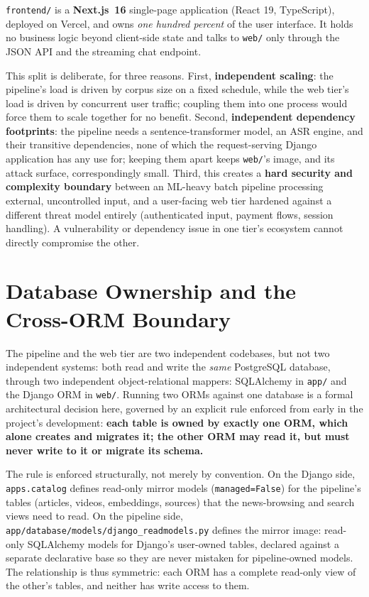 \texttt{frontend/} is a \textbf{Next.js~16} single-page application (React
19, TypeScript), deployed on Vercel, and owns \emph{one hundred percent} of
the user interface. It holds no business logic beyond client-side state and
talks to \texttt{web/} only through the JSON API and the streaming chat
endpoint.

This split is deliberate, for three reasons. First, \textbf{independent
scaling}: the pipeline's load is driven by corpus size on a fixed schedule,
while the web tier's load is driven by concurrent user traffic; coupling
them into one process would force them to scale together for no benefit.
Second, \textbf{independent dependency footprints}: the pipeline needs a
sentence-transformer model, an ASR engine, and their transitive
dependencies, none of which the request-serving Django application has any
use for; keeping them apart keeps \texttt{web/}'s image, and its attack
surface, correspondingly small. Third, this creates a \textbf{hard security
and complexity boundary} between an ML-heavy batch pipeline processing
external, uncontrolled input, and a user-facing web tier hardened against a
different threat model entirely (authenticated input, payment flows,
session handling). A vulnerability or dependency issue in one tier's
ecosystem cannot directly compromise the other.

\section{Database Ownership and the Cross-ORM Boundary}
\label{sec:arch-orm-boundary}

The pipeline and the web tier are two independent codebases, but not two
independent systems: both read and write the \emph{same} PostgreSQL
database, through two independent object-relational mappers: SQLAlchemy in
\texttt{app/} and the Django ORM in \texttt{web/}. Running two ORMs against
one database is a formal architectural decision here, governed by an
explicit rule enforced from early in the project's development: \textbf{each
table is owned by exactly one ORM, which alone creates and migrates it; the
other ORM may read it, but must never write to it or migrate its schema.}

The rule is enforced structurally, not merely by convention. On the Django
side, \texttt{apps.catalog} defines read-only mirror models
(\texttt{managed=False}) for the pipeline's tables (articles, videos,
embeddings, sources) that the news-browsing and search views need to read.
On the pipeline side, \texttt{app/database/models/django\_readmodels.py}
defines the mirror image: read-only SQLAlchemy models for Django's
user-owned tables, declared against a separate declarative base so they are
never mistaken for pipeline-owned models. The relationship is thus
symmetric: each ORM has a complete read-only view of the other's tables, and
neither has write access to them.


